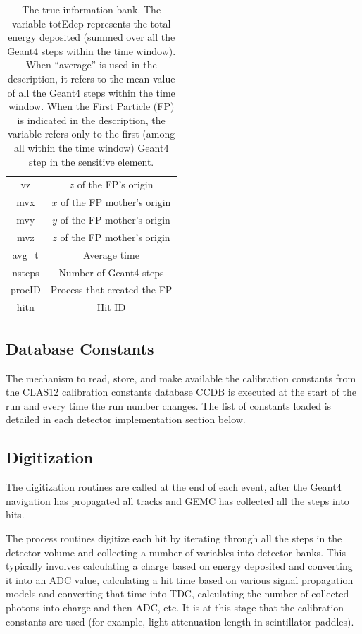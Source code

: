 \begin{table}[h]
\begin{center}
\begin{tabular}{| c | c |}
				vz          &   $z$  of the FP's origin \\
				mvx         &   $x$  of the FP mother's origin\\
				mvy         &   $y$  of the FP mother's origin \\
				mvz         &   $z$  of the FP mother's origin \\
				avg\_t      &   Average time \\
				nsteps      &   Number of Geant4 steps \\
				procID      &   Process that created the FP  \\
				hitn        &   Hit ID \\
			\hline \hline
		\end{tabular}
	\end{center}
	\caption{The true information bank. The variable totEdep represents the total energy deposited (summed over all
             the Geant4 steps within the time window). When ``average'' is used in the description, it refers to
             the mean value of all the Geant4 steps within the time window.
             When the First Particle (FP) is indicated in the description, the variable refers only to the
             first (among all within the time window) Geant4 step in the sensitive element.
}\label{tab:trueInformation}
\end{table}


\subsection{Database Constants}

The mechanism to read, store, and make available the calibration constants from the CLAS12
calibration constants database CCDB \cite{ccdb} is
executed at the start of the run and every time the run number changes.
The list of constants loaded is detailed in each detector implementation section below.

\subsection{Digitization}

The digitization routines are called at the end of each event, after the Geant4 navigation
has propagated all tracks and GEMC has collected all the steps into hits.

The process routines digitize each hit by iterating through all the steps in the detector volume and collecting
a number of variables into detector banks. This typically involves calculating a charge based
on energy deposited and converting it into an ADC value, calculating a hit time based
on various signal propagation models and converting that time into TDC, calculating the number
of collected photons into charge and then ADC, etc. It is at this stage that the calibration
constants are used (for example, light attenuation length in scintillator paddles).

